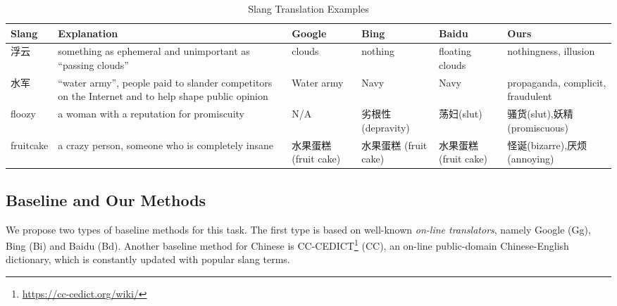 \begin{table*}[t]
	\scriptsize
	\centering
	\caption{Slang Translation Examples 
		\vspace{-15pt}}
	\begin{tabular}{L{1.2cm}|L{4.7cm}|L{1.7cm}|L{1.7cm}|L{1.7cm}|L{2.8cm}}
		\textbf{Slang} & \textbf{Explanation} & \textbf{Google}& \textbf{Bing}& \textbf{Baidu} & \textbf{Ours} \\ \hline 
		浮云 &something as ephemeral and unimportant as ``passing clouds''& clouds& nothing& floating clouds & nothingness, illusion \\ \hline
		水军 &``water army'', people paid to slander competitors on the Internet and to help shape public opinion& Water army& Navy& Navy & propaganda, complicit, fraudulent\\ \hline
		floozy & a woman with a reputation for promiscuity & N/A&劣根性 (depravity)&荡妇(slut)&骚货(slut),妖精(promiscuous)\\ \hline
		fruitcake& a crazy person, someone who is completely insane & 水果蛋糕 \quad(fruit cake)&水果蛋糕 \qquad(fruit cake)&水果蛋糕 \quad(fruit cake)& 怪诞(bizarre),厌烦(annoying)\\  
	\end{tabular}
	\label{tab:bleis_3}
\end{table*}
\subsection{Baseline and Our Methods} 
We propose two types of baseline methods for this task. 
The first type is based on well-known {\em on-line translators}, 
namely Google (Gg), 
Bing (Bi) and Baidu (Bd).
Another baseline method for Chinese is  CC-CEDICT\footnote{\scriptsize{\url{https://cc-cedict.org/wiki/}}} (CC), an on-line public-domain Chinese-English dictionary, which is constantly updated with popular slang terms. 


